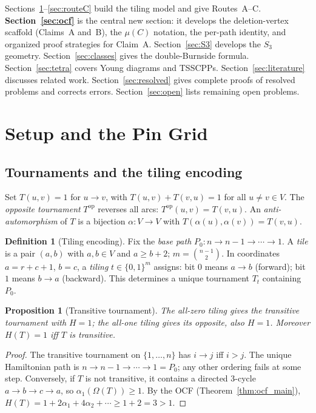 \documentclass[12pt,reqno]{amsart}
\theoremstyle{plain}
\newtheorem{proposition}[theorem]{Proposition}
\theoremstyle{definition}
\newtheorem{definition}[theorem]{Definition}
\theoremstyle{remark}
\newcommand{\op}{\mathrm{op}}
\begin{document}
Sections~\ref{sec:setup}--\ref{sec:routeC} build the tiling model and give
Routes~A--C. \textbf{Section~\ref{sec:ocf}} is the central new section: it develops the
deletion-vertex scaffold (Claims~A and~B), the $\mu(C)$ notation, the per-path
identity, and organized proof strategies for Claim~A.
Section~\ref{sec:S3} develops the $S_3$ geometry.
Section~\ref{sec:classes} gives the double-Burnside formula.
Section~\ref{sec:tetra} covers Young diagrams and TSSCPPs.
Section~\ref{sec:literature} discusses related work.
Section~\ref{sec:resolved} gives complete proofs of resolved problems and
corrects errors. Section~\ref{sec:open} lists remaining open problems.

\section{Setup and the Pin Grid}
\label{sec:setup}

\subsection{Tournaments and the tiling encoding}

Set $T(u,v)=1$ for $u\to v$, with $T(u,v)+T(v,u)=1$ for all $u\ne v\in V$.
The \emph{opposite tournament} $T^{\op}$ reverses all arcs: $T^{\op}(u,v)=T(v,u)$.
An \emph{anti-automorphism} of $T$ is a bijection $\alpha:V\to V$ with
$T(\alpha(u),\alpha(v))=T(v,u)$.

\begin{definition}[Tiling encoding]\label{def:tiling}
Fix the \emph{base path} $P_0\colon n\to n{-}1\to\cdots\to 1$. A \emph{tile}
is a pair $(a,b)$ with $a,b\in V$ and $a\ge b+2$; $m=\binom{n-1}{2}$. In
coordinates $a=r+c+1$, $b=c$, a \emph{tiling} $t\in\{0,1\}^m$ assigns: bit
$0$ means $a\to b$ (forward); bit $1$ means $b\to a$ (backward). This determines
a unique tournament $T_t$ containing $P_0$.
\end{definition}

\begin{proposition}[Transitive tournament]
\label{prop:transitive}
The all-zero tiling gives the transitive tournament with $H=1$; the all-one
tiling gives its opposite, also $H=1$. Moreover $H(T)=1$ iff $T$ is transitive.
\end{proposition}
\begin{proof}
The transitive tournament on $\{1,\ldots,n\}$ has $i\to j$ iff $i>j$. The unique
Hamiltonian path is $n\to n{-}1\to\cdots\to 1 = P_0$; any other ordering fails at some step.
Conversely, if $T$ is not transitive, it contains a directed 3-cycle
$a\to b\to c\to a$, so $\alpha_1(\Omega(T)) \geq 1$. By the OCF
(Theorem~\ref{thm:ocf_main}), $H(T) = 1 + 2\alpha_1 + 4\alpha_2 + \cdots
\geq 1 + 2 = 3 > 1$.
\end{proof}
\end{document}
